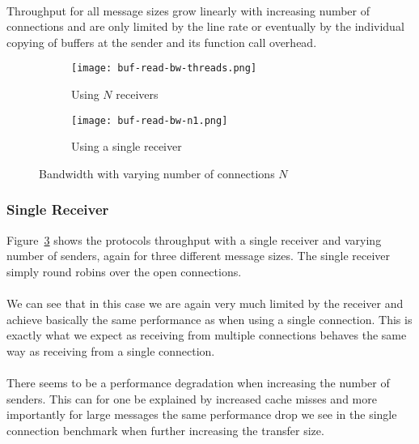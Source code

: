 \paragraph{} Throughput for all message sizes grow linearly with increasing number of connections and are only limited by the
 line rate or eventually by the individual copying of buffers at the sender and its function call overhead.

\begin{figure}[ht]
  \begin{subfigure}[b]{0.49\textwidth}
  \centering
  \texttt{[image: buf-read-bw-threads.png]}
  \caption{Using $N$ receivers}
  \label{fig:plot-bufread-bw-threads}
  \end{subfigure}
  \begin{subfigure}[b]{0.49\textwidth}
  \centering
  \texttt{[image: buf-read-bw-n1.png]}
  \caption{Using a single receiver}
  \label{fig:plot-bufread-bw-n1}
  \end{subfigure}
  \caption{Bandwidth with varying number of connections $N$}
\end{figure}

\subsubsection{Single Receiver}

Figure~\ref{fig:plot-bufread-bw-n1} shows the protocols throughput with a single receiver and varying number of senders, 
again for three different message sizes. The single receiver simply round robins over the open connections.

\paragraph{} We can see that in this case we are again very much limited by the receiver and achieve basically the same
performance as when using a single connection. This is exactly what we expect as receiving from multiple connections 
behaves the same way as receiving from a single connection.

\paragraph{} There seems to be a performance degradation when increasing the number of senders. This can for one be explained
by increased cache misses and more importantly for large messages the same performance drop we see in the single connection 
benchmark when further increasing the transfer size.

